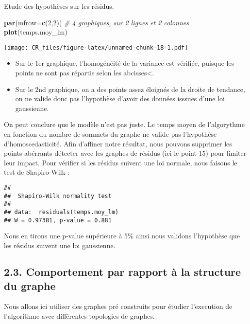 \documentclass[
]{article}
\newenvironment{Shaded}{\begin{snugshade}}{\end{snugshade}}
\newcommand{\CommentTok}[1]{\textcolor[rgb]{0.56,0.35,0.01}{\textit{#1}}}
\newcommand{\DataTypeTok}[1]{\textcolor[rgb]{0.13,0.29,0.53}{#1}}
\newcommand{\DecValTok}[1]{\textcolor[rgb]{0.00,0.00,0.81}{#1}}
\newcommand{\KeywordTok}[1]{\textcolor[rgb]{0.13,0.29,0.53}{\textbf{#1}}}
\newcommand{\NormalTok}[1]{#1}
\providecommand{\tightlist}{%
  \setlength{\itemsep}{0pt}\setlength{\parskip}{0pt}}
\begin{document}
Etude des hypothèses sur les résidus.

\begin{Shaded}
\begin{Highlighting}[]
\KeywordTok{par}\NormalTok{(}\DataTypeTok{mfrow=}\KeywordTok{c}\NormalTok{(}\DecValTok{2}\NormalTok{,}\DecValTok{2}\NormalTok{)) }\CommentTok{# 4 graphiques, sur 2 lignes et 2 colonnes}
\KeywordTok{plot}\NormalTok{(temps.moy_lm)}
\end{Highlighting}
\end{Shaded}

\texttt{[image: CR\_files/figure-latex/unnamed-chunk-18-1.pdf]}

\begin{itemize}
\tightlist
\item
  Sur le 1er graphique, l'homogénéité de la variance est vérifiée,
  puisque les points ne sont pas répartis selon les abcisses\textless.
\item
  Sur le 2nd graphique, on a des points assez éloignés de la droite de
  tendance, on ne valide donc pas l'hypothèse d'avoir des données
  isssues d'une loi gaussienne.
\end{itemize}

On peut conclure que le modèle n'est pas juste. Le temps moyen de
l'algorythme en fonction du nombre de sommets du graphe ne valide pas
l'hypothèse d'homoscedasticité. Afin d'affiner notre résultat, nous
pouvons supprimer les points abérrants détecter avec les graphes de
résidus (ici le point 15) pour limiter leur impact. Pour vérifier si les
résidus suivent une loi normale, nous faisons le test de Shapiro-Wilk :

\begin{verbatim}
## 
##  Shapiro-Wilk normality test
## 
## data:  residuals(temps.moy_lm)
## W = 0.97381, p-value = 0.881
\end{verbatim}

Nous en tirons une p-value supérieure à 5\% ainsi nous validons
l'hypothèse que les résidus suivent une loi gaussienne.

\hypertarget{comportement-par-rapport-uxe0-la-structure-du-graphe}{%
\subsection{2.3. Comportement par rapport à la structure du
graphe}\label{comportement-par-rapport-uxe0-la-structure-du-graphe}}

Nous allons ici utiliser des graphes pré construits pour étudier
l'execution de l'algorithme avec différentes topologies de graphes.
\end{document}
